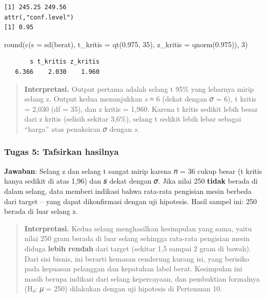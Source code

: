 \documentclass[
  indonesian,
  letterpaper,
]{book}
\newenvironment{Shaded}{\begin{snugshade}}{\end{snugshade}}
\newcommand{\AttributeTok}[1]{\textcolor[rgb]{0.40,0.45,0.13}{#1}}
\newcommand{\DecValTok}[1]{\textcolor[rgb]{0.68,0.00,0.00}{#1}}
\newcommand{\FloatTok}[1]{\textcolor[rgb]{0.68,0.00,0.00}{#1}}
\newcommand{\FunctionTok}[1]{\textcolor[rgb]{0.28,0.35,0.67}{#1}}
\newcommand{\NormalTok}[1]{\textcolor[rgb]{0.00,0.23,0.31}{#1}}
\begin{document}
\begin{verbatim}
[1] 245.25 249.56
attr(,"conf.level")
[1] 0.95
\end{verbatim}

\begin{Shaded}
\begin{Highlighting}[]
\FunctionTok{round}\NormalTok{(}\FunctionTok{c}\NormalTok{(}\AttributeTok{s =} \FunctionTok{sd}\NormalTok{(berat), }\AttributeTok{t\_kritis =} \FunctionTok{qt}\NormalTok{(}\FloatTok{0.975}\NormalTok{, }\DecValTok{35}\NormalTok{), }\AttributeTok{z\_kritis =} \FunctionTok{qnorm}\NormalTok{(}\FloatTok{0.975}\NormalTok{)), }\DecValTok{3}\NormalTok{)}
\end{Highlighting}
\end{Shaded}

\begin{verbatim}
       s t_kritis z_kritis 
   6.366    2.030    1.960 
\end{verbatim}

\begin{quote}
\textbf{Interpretasi.} Output pertama adalah selang t 95\% yang lebarnya
mirip selang z. Output kedua menunjukkan \emph{s} ≈ 6 (dekat dengan 𝜎 =
6), t kritis = 2,030 (df = 35), dan z kritis = 1,960. Karena t kritis
sedikit lebih besar dari z kritis (selisih sekitar 3,6\%), selang t
sedikit lebih lebar sebagai ``harga'' atas penaksiran 𝜎 dengan \emph{s}.
\end{quote}

\subsubsection{Tugas 5: Tafsirkan
hasilnya}\label{tugas-5-tafsirkan-hasilnya}

\textbf{Jawaban}: Selang z dan selang t sangat mirip karena 𝑛 = 36 cukup
besar (t kritis hanya sedikit di atas 1,96) dan 𝑠 dekat dengan 𝜎. Jika
nilai 250 \textbf{tidak} berada di dalam selang, data memberi indikasi
bahwa rata-rata pengisian mesin berbeda dari target -- yang dapat
dikonfirmasi dengan uji hipotesis. Hasil sampel ini: 250 berada di luar
selang z.

\begin{quote}
\textbf{Interpretasi.} Kedua selang menghasilkan kesimpulan yang sama,
yaitu nilai 250 gram berada di luar selang sehingga rata-rata pengisian
mesin diduga \textbf{lebih rendah} dari target (sekitar 1,5 sampai 2
gram di bawah). Dari sisi bisnis, ini berarti kemasan cenderung kurang
isi, yang berisiko pada kepuasan pelanggan dan kepatuhan label berat.
Kesimpulan ini masih berupa indikasi dari selang kepercayaan, dan
pembuktian formalnya (H₀: 𝜇 = 250) dilakukan dengan uji hipotesis di
Pertemuan 10.
\end{quote}
\end{document}
